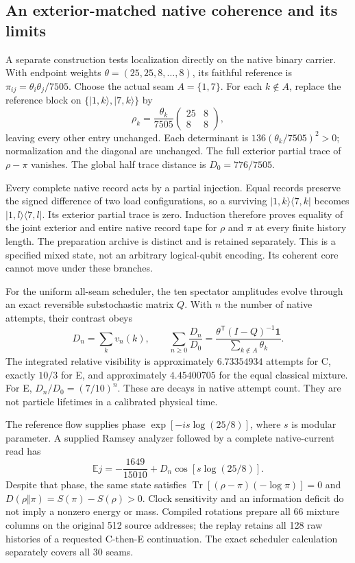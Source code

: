\subsection{An exterior-matched native coherence and its limits}
\label{subsec:native-localized-clock}

A separate construction tests localization directly on the native binary
carrier. With endpoint weights $\theta=(25,25,8,\ldots,8)$, its faithful
reference is $\pi_{ij}=\theta_i\theta_j/7505$. Choose the actual seam
$A=\{1,7\}$. For each $k\notin A$, replace the reference block on
$\{|1,k\rangle,|7,k\rangle\}$ by
\[
 \rho_k=\frac{\theta_k}{7505}
 \begin{pmatrix}25&8\\8&8\end{pmatrix},
\]
leaving every other entry unchanged. Each determinant is
$136(\theta_k/7505)^2>0$; normalization and the diagonal are unchanged.
The full exterior partial trace of $\rho-\pi$ vanishes. The global half
trace distance is $D_0=776/7505$.

Every complete native record acts by a partial injection. Equal records
preserve the signed difference of two load configurations, so a surviving
$|1,k\rangle\langle7,k|$ becomes $|1,l\rangle\langle7,l|$.
Its exterior partial trace is zero. Induction therefore proves equality
of the joint exterior and entire native record tape for $\rho$ and $\pi$
at every finite history length. The preparation archive is distinct and
is retained separately. This is a specified mixed state, not an arbitrary
logical-qubit encoding. Its coherent core cannot move under these branches.

For the uniform all-seam scheduler, the ten spectator amplitudes evolve
through an exact reversible substochastic matrix $Q$. With $n$ the number
of native attempts, their contrast obeys
\[
 D_n=\sum_k v_n(k),\qquad
 \sum_{n\ge0}\frac{D_n}{D_0}
 =\frac{\theta^\mathsf T(I-Q)^{-1}\mathbf1}
        {\sum_{k\notin A}\theta_k}.
\]
The integrated relative visibility is approximately $6.73354934$ attempts
for C, exactly $10/3$ for E, and approximately $4.45400705$ for the equal
classical mixture. For E, $D_n/D_0=(7/10)^n$. These are decays in native
attempt count. They are not particle lifetimes in a calibrated physical time.

The reference flow supplies phase $\exp[-is\log(25/8)]$, where $s$ is
modular parameter. A supplied Ramsey analyzer followed by a complete
native-current read has
\[
 \mathbb E j=-\frac{1649}{15010}+D_n\cos[s\log(25/8)].
\]
Despite that phase, the same state satisfies
$\operatorname{Tr}[(\rho-\pi)(-\log\pi)]=0$ and
$D(\rho\Vert\pi)=S(\pi)-S(\rho)>0$. Clock sensitivity and an information
deficit do not imply a nonzero energy or mass. Compiled rotations prepare
all 66 mixture columns on the original 512 source addresses; the replay
retains all 128 raw histories of a requested C-then-E continuation.
The exact scheduler calculation separately covers all 30 seams.

